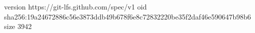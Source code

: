 version https://git-lfs.github.com/spec/v1
oid sha256:19a24672886c56e3873ddb49b678f6e8c72832220be35f2daf46e590647b98b6
size 3942
